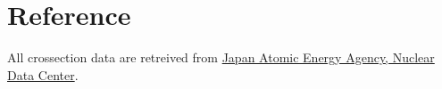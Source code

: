 \documentclass{article}
\begin{document}
\newpage
\section*{Reference}
    All crossection data are retreived from 
    \href{https://wwwndc.jaea.go.jp/jendl/j33/j33.html}{Japan Atomic Energy Agency,
    Nuclear Data Center}.
\end{document}
